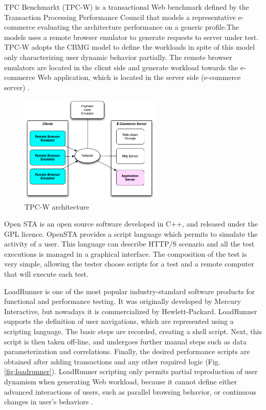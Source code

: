 \documentclass{report}
\begin{document}
TPC Benchmarkt (TPC-W) is a transactional Web benchmark defined by the Transaction Processing Performance Council that models a representative e-commerce evaluating the architecture performance on a generic profile.The models uses a remote browser emulator to generate requests to server under test. TPC-W adopts the CBMG model to define the workloads in spite of this model only characterizing user dynamic behavior partially. The remote browser emulators are located in the client side and generate workload towards the e-commerce Web application, which is located in the server side (e-commerce server) \cite{MohammadS.Obaidat} \cite{Menasce2002a}.

\begin{figure}[h]
\centering
\includegraphics[width=0.6\textwidth]{./images/tpcw.png}
\caption{TPC-W architecture \cite{MohammadS.Obaidat} \cite{Menasce2002a}}
\label{fig:tpcw}
\end{figure}


Open STA is an open source software developed in C++, and released under the GPL licence. OpenSTA provides a script language which permits to simulate the activity of a user. This language can describe HTTP/S scenario and all the test executions is managed in a graphical interface. The composition of the test is
very simple, allowing the tester choose scripts for a test and a remote computer that will execute each test.


LoadRunner is one of the most popular industry-standard software products for functional and performance testing. It was originally developed by Mercury Interactive, but nowadays it is commercialized by Hewlett-Packard. LoadRunner supports the definition of user navigations, which are represented using a scripting language. The basic steps are recorded, creating a shell script. Next, this script is then taken off-line, and undergoes further manual steps such as data parameterization and correlations. Finally, the desired performance scripts are obtained after adding transactions and any other required logic (Fig. \ref{fig:loadrunner}). LoadRunner scripting only permits partial reproduction of user dynamism when generating Web workload, because it cannot define either advanced interactions of users, such as parallel browsing behavior, or continuous changes in user’s behaviors \cite{MohammadS.Obaidat}.
\end{document}
